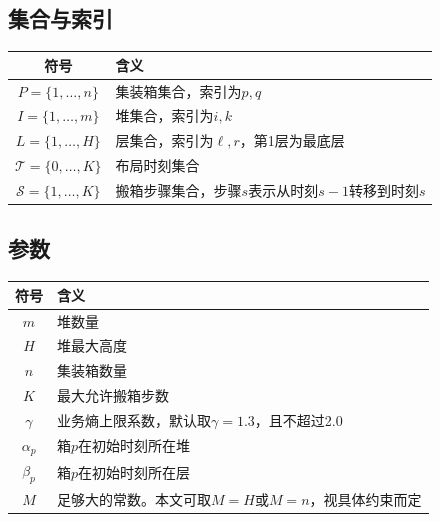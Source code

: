 \documentclass[11pt,a4paper]{ctexart}
\begin{document}
\subsection{集合与索引}
\begin{table}[H]
\centering
\renewcommand{\arraystretch}{1.35}
\begin{tabularx}{0.92\textwidth}{>{\bfseries}c >{\raggedright\arraybackslash}X}
\toprule
符号 & 含义 \\
\midrule
$P=\{1,\ldots,n\}$ & 集装箱集合，索引为$p,q$ \\
$I=\{1,\ldots,m\}$ & 堆集合，索引为$i,k$ \\
$L=\{1,\ldots,H\}$ & 层集合，索引为$\ell,r$，第1层为最底层 \\
$\mathcal{T}=\{0,\ldots,K\}$ & 布局时刻集合 \\
$\mathcal{S}=\{1,\ldots,K\}$ & 搬箱步骤集合，步骤$s$表示从时刻$s-1$转移到时刻$s$ \\
\bottomrule
\end{tabularx}
\end{table}

\subsection{参数}
\begin{table}[H]
\centering
\renewcommand{\arraystretch}{1.35}
\begin{tabularx}{0.92\textwidth}{>{\bfseries}c >{\raggedright\arraybackslash}X}
\toprule
符号 & 含义 \\
\midrule
$m$ & 堆数量 \\
$H$ & 堆最大高度 \\
$n$ & 集装箱数量 \\
$K$ & 最大允许搬箱步数 \\
$\gamma$ & 业务熵上限系数，默认取$\gamma=1.3$，且不超过2.0 \\
$\alpha_p$ & 箱$p$在初始时刻所在堆 \\
$\beta_p$ & 箱$p$在初始时刻所在层 \\
$M$ & 足够大的常数。本文可取$M=H$或$M=n$，视具体约束而定 \\
\bottomrule
\end{tabularx}
\end{table}
\end{document}
